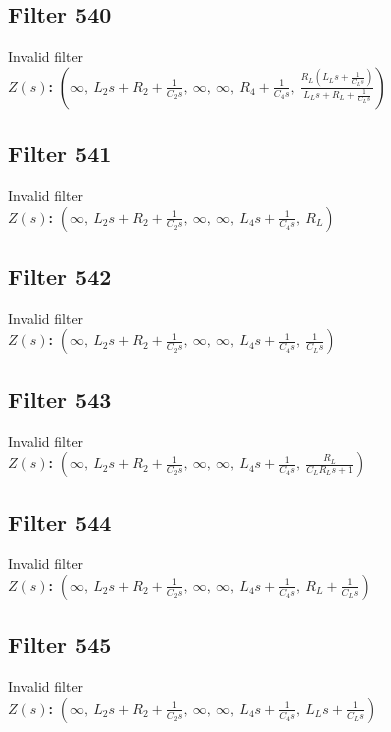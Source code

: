 \documentclass{article}
\begin{document}
\subsection*{Filter 540}
Invalid filter \\ 
\textbf{$Z(s)$:} $\left( \infty, \  L_{2} s + R_{2} + \frac{1}{C_{2} s}, \  \infty, \  \infty, \  R_{4} + \frac{1}{C_{4} s}, \  \frac{R_{L} \left(L_{L} s + \frac{1}{C_{L} s}\right)}{L_{L} s + R_{L} + \frac{1}{C_{L} s}}\right)$ \\ 
\subsection*{Filter 541}
Invalid filter \\ 
\textbf{$Z(s)$:} $\left( \infty, \  L_{2} s + R_{2} + \frac{1}{C_{2} s}, \  \infty, \  \infty, \  L_{4} s + \frac{1}{C_{4} s}, \  R_{L}\right)$ \\ 
\subsection*{Filter 542}
Invalid filter \\ 
\textbf{$Z(s)$:} $\left( \infty, \  L_{2} s + R_{2} + \frac{1}{C_{2} s}, \  \infty, \  \infty, \  L_{4} s + \frac{1}{C_{4} s}, \  \frac{1}{C_{L} s}\right)$ \\ 
\subsection*{Filter 543}
Invalid filter \\ 
\textbf{$Z(s)$:} $\left( \infty, \  L_{2} s + R_{2} + \frac{1}{C_{2} s}, \  \infty, \  \infty, \  L_{4} s + \frac{1}{C_{4} s}, \  \frac{R_{L}}{C_{L} R_{L} s + 1}\right)$ \\ 
\subsection*{Filter 544}
Invalid filter \\ 
\textbf{$Z(s)$:} $\left( \infty, \  L_{2} s + R_{2} + \frac{1}{C_{2} s}, \  \infty, \  \infty, \  L_{4} s + \frac{1}{C_{4} s}, \  R_{L} + \frac{1}{C_{L} s}\right)$ \\ 
\subsection*{Filter 545}
Invalid filter \\ 
\textbf{$Z(s)$:} $\left( \infty, \  L_{2} s + R_{2} + \frac{1}{C_{2} s}, \  \infty, \  \infty, \  L_{4} s + \frac{1}{C_{4} s}, \  L_{L} s + \frac{1}{C_{L} s}\right)$ \\ 
\end{document}
